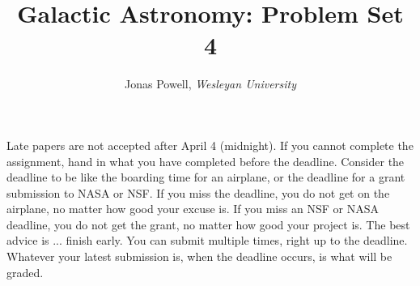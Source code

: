 \documentclass[12pt]{article}
\begin{document}



\title{\Large \textbf{Galactic Astronomy: Problem Set 4}}

\author{{\rm Jonas Powell, \textit{Wesleyan University}}}


\maketitle


\begin{addmargin}[4em]{4em}
 Late papers are not accepted after April 4 (midnight). If you cannot complete the assignment, hand in what you have completed before the deadline. Consider the deadline to be like the boarding time for an airplane, or the deadline for a grant submission to NASA or NSF. If you miss the deadline, you do not get on the airplane, no matter how good your excuse is. If you miss an NSF or NASA deadline, you do not get the grant, no matter how good your project is. The best advice is ... finish early. You can submit multiple times, right up to the deadline. Whatever your latest submission is, when the deadline occurs, is what will be graded.
\bigskip \bigskip
\end{addmargin}



\end{document}
